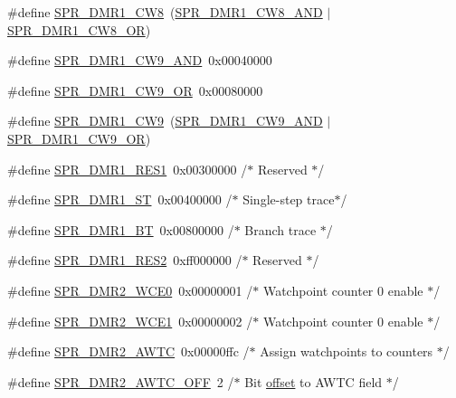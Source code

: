 \begin{DoxyCompactItemize}
\#define \hyperlink{spr-defs_8h_a6e5e1778a2a41e2de3b0563b95b9cf1b}{\-S\-P\-R\-\_\-\-D\-M\-R1\-\_\-\-C\-W8}~(\hyperlink{spr-defs_8h_a748c78dea93a1f7ee5fea5a9ef026df2}{\-S\-P\-R\-\_\-\-D\-M\-R1\-\_\-\-C\-W8\-\_\-\-A\-N\-D} $|$ \hyperlink{spr-defs_8h_a998e0d35bd5a3ed84b80a1b28cb66f3f}{\-S\-P\-R\-\_\-\-D\-M\-R1\-\_\-\-C\-W8\-\_\-\-O\-R})
\item 
\#define \hyperlink{spr-defs_8h_adc8fa6be9036d3d179a0c0cfaf12af91}{\-S\-P\-R\-\_\-\-D\-M\-R1\-\_\-\-C\-W9\-\_\-\-A\-N\-D}~0x00040000
\item 
\#define \hyperlink{spr-defs_8h_ac915b58d435aaa309a3aa30a8110236a}{\-S\-P\-R\-\_\-\-D\-M\-R1\-\_\-\-C\-W9\-\_\-\-O\-R}~0x00080000
\item 
\#define \hyperlink{spr-defs_8h_aa2170a73de03c6bbfd0182d853e1428b}{\-S\-P\-R\-\_\-\-D\-M\-R1\-\_\-\-C\-W9}~(\hyperlink{spr-defs_8h_adc8fa6be9036d3d179a0c0cfaf12af91}{\-S\-P\-R\-\_\-\-D\-M\-R1\-\_\-\-C\-W9\-\_\-\-A\-N\-D} $|$ \hyperlink{spr-defs_8h_ac915b58d435aaa309a3aa30a8110236a}{\-S\-P\-R\-\_\-\-D\-M\-R1\-\_\-\-C\-W9\-\_\-\-O\-R})
\item 
\#define \hyperlink{spr-defs_8h_a77518cb189399c9b46cac599e064f88b}{\-S\-P\-R\-\_\-\-D\-M\-R1\-\_\-\-R\-E\-S1}~0x00300000  /$\ast$ Reserved $\ast$/
\item 
\#define \hyperlink{spr-defs_8h_a1a84d6053bc127a7d4554fc2dd239be6}{\-S\-P\-R\-\_\-\-D\-M\-R1\-\_\-\-S\-T}~0x00400000  /$\ast$ Single-\/step trace$\ast$/
\item 
\#define \hyperlink{spr-defs_8h_a2a56728ceea18c106491f919e48e0d7d}{\-S\-P\-R\-\_\-\-D\-M\-R1\-\_\-\-B\-T}~0x00800000  /$\ast$ Branch trace $\ast$/
\item 
\#define \hyperlink{spr-defs_8h_a9f9832d69d8c16e71e535b46a8caf12a}{\-S\-P\-R\-\_\-\-D\-M\-R1\-\_\-\-R\-E\-S2}~0xff000000  /$\ast$ Reserved $\ast$/
\item 
\#define \hyperlink{spr-defs_8h_a0a1b807cad79f61639db52c319ec9d4b}{\-S\-P\-R\-\_\-\-D\-M\-R2\-\_\-\-W\-C\-E0}~0x00000001  /$\ast$ Watchpoint counter 0 enable $\ast$/
\item 
\#define \hyperlink{spr-defs_8h_a09ce94611cedea35fd911a85ed706539}{\-S\-P\-R\-\_\-\-D\-M\-R2\-\_\-\-W\-C\-E1}~0x00000002  /$\ast$ Watchpoint counter 0 enable $\ast$/
\item 
\#define \hyperlink{spr-defs_8h_a4be1bb9daddfbfc0f66a0dd56273a2f2}{\-S\-P\-R\-\_\-\-D\-M\-R2\-\_\-\-A\-W\-T\-C}~0x00000ffc  /$\ast$ Assign watchpoints to counters $\ast$/
\item 
\#define \hyperlink{spr-defs_8h_a508c18ad21ea0d1a11febfaa3d26ace8}{\-S\-P\-R\-\_\-\-D\-M\-R2\-\_\-\-A\-W\-T\-C\-\_\-\-O\-F\-F}~2  /$\ast$ \-Bit \hyperlink{alt__flash_8h_a461f0be37c7c42bd613e22be8678818a}{offset} to \-A\-W\-T\-C field $\ast$/

\end{DoxyCompactItemize}
